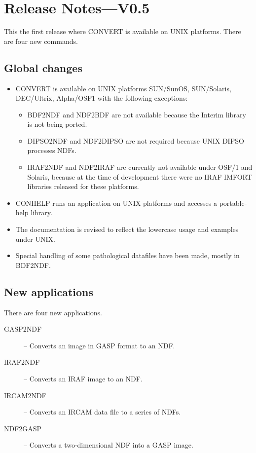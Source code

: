 \section{Release Notes---V0.5}

This the first release where {\footnotesize CONVERT} is available on
UNIX platforms.  There are four new commands. 

\subsection{Global changes}
\begin{itemize}
  \item  {\footnotesize CONVERT} is available on UNIX platforms
         SUN/SunOS, SUN/Solaris, DEC/Ultrix, Alpha/OSF1 with the
         following exceptions:

  \begin{itemize}

     \item BDF2NDF and NDF2BDF are not available because the Interim
           library is not being ported.

     \item DIPSO2NDF and NDF2DIPSO are not required because UNIX DIPSO
           processes NDFs.

     \item IRAF2NDF and NDF2IRAF are currently not available under OSF/1
           and Solaris, because at the time of development there were no
           IRAF IMFORT libraries released for these platforms.
  \end{itemize}

  \item  CONHELP runs an application on UNIX platforms and accesses a
         portable-help library.

  \item  The documentation is revised to reflect the lowercase usage and
         examples under UNIX.

  \item  Special handling of some pathological datafiles have been made,
         mostly in BDF2NDF.
\end{itemize}

\subsection{New applications}
There are four new applications.

\begin{description}
   \item [GASP2NDF] -- Converts an image in GASP format to an NDF.
   \item [IRAF2NDF] -- Converts an IRAF image to an NDF.
   \item [IRCAM2NDF] -- Converts an IRCAM data file to a series of NDFs.
   \item [NDF2GASP] -- Converts a two-dimensional NDF into a GASP image.
\end{description}

